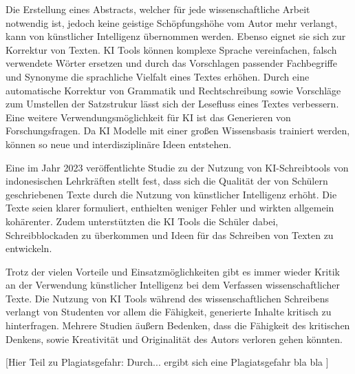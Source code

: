\documentclass[../main.tex]{subfiles}
\begin{document}
Die Erstellung eines Abstracts, welcher für jede wissenschaftliche Arbeit notwendig ist, jedoch keine geistige Schöpfungshöhe vom Autor mehr verlangt, 
kann von künstlicher Intelligenz übernommen werden. Ebenso eignet sie sich zur Korrektur von Texten. KI Tools können komplexe Sprache vereinfachen, falsch 
verwendete Wörter ersetzen und durch das Vorschlagen passender Fachbegriffe und Synonyme die sprachliche Vielfalt eines Textes erhöhen. Durch eine 
automatische Korrektur von Grammatik und Rechtschreibung sowie Vorschläge zum Umstellen der Satzstrukur lässt sich der Lesefluss eines Textes verbessern.\cite{ZukunftWissenschaftlichesPublizieren,teachers}\\
Eine weitere Verwendungsmöglichkeit für KI ist das Generieren von Forschungsfragen. Da KI Modelle mit einer großen Wissensbasis trainiert werden, 
können so neue und interdisziplinäre Ideen entstehen.\cite{ZukunftWissenschaftlichesPublizieren,humanWritingToAi}

Eine im Jahr 2023 veröffentlichte Studie zu der Nutzung von KI-Schreibtools von indonesischen Lehrkräften stellt fest, dass sich die Qualität der von 
Schülern geschriebenen Texte durch die Nutzung von künstlicher Intelligenz erhöht. Die Texte seien klarer formuliert, enthielten weniger Fehler und 
wirkten allgemein kohärenter. Zudem unterstützten die KI Tools die Schüler dabei, Schreibblockaden zu überkommen und Ideen für das Schreiben von Texten zu entwickeln.\cite{teachers} 

Trotz der vielen Vorteile und Einsatzmöglichkeiten gibt es immer wieder Kritik an der Verwendung künstlicher Intelligenz bei dem Verfassen wissenschaftlicher Texte. 
Die Nutzung von KI Tools während des wissenschaftlichen Schreibens verlangt von Studenten vor allem die Fähigkeit, generierte Inhalte kritisch zu 
hinterfragen. Mehrere Studien äußern Bedenken, dass die Fähigkeit des kritischen Denkens, sowie Kreativität und Originalität des Autors verloren gehen könnten.\cite{ZukunftWissenschaftlichesPublizieren,teachers,BucherSchwarzerHolzwweißig}

[Hier Teil zu Plagiatsgefahr: Durch... ergibt sich eine Plagiatsgefahr bla bla ]
\end{document}
